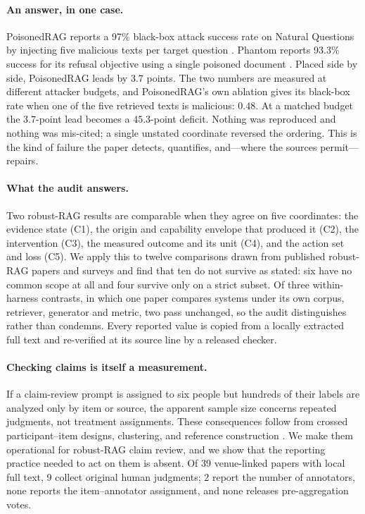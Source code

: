 \documentclass[11pt]{article}
\begin{document}
\paragraph{An answer, in one case.}
PoisonedRAG reports a 97\% black-box attack success rate on Natural Questions
by injecting five malicious texts per target question \citep{poisonedRAG2024}.
Phantom reports 93.3\% success for its refusal objective using a single
poisoned document \citep{phantom2024}. Placed side by side, PoisonedRAG leads
by $3.7$ points. The two numbers are measured at different attacker budgets,
and PoisonedRAG's own ablation gives its black-box rate when one of the five
retrieved texts is malicious: $0.48$. At a matched budget the $3.7$-point lead
becomes a $45.3$-point deficit. Nothing was reproduced and nothing was
mis-cited; a single unstated coordinate reversed the ordering. This is the
kind of failure the paper detects, quantifies, and---where the sources
permit---repairs.



\paragraph{What the audit answers.}
Two robust-RAG results are comparable when they agree on five coordinates:
the evidence state (C1), the origin and capability envelope that produced it
(C2), the intervention (C3), the measured outcome and its unit (C4), and the
action set and loss (C5). We apply this to twelve comparisons drawn from
published robust-RAG papers and surveys and find that ten do not survive as
stated: six have no common scope at all and four survive only on a strict
subset. Of three within-harness contrasts, in which one paper compares systems
under its own corpus, retriever, generator and metric, two pass unchanged, so
the audit distinguishes rather than condemns. Every reported value is copied from
a locally extracted full text and re-verified at its source line by a released
checker.

\paragraph{Checking claims is itself a measurement.}
If a claim-review prompt is assigned to six people but hundreds of their
labels are analyzed only by item or source, the apparent sample size concerns
repeated judgments, not treatment assignments. These consequences follow from
crossed participant--item designs, clustering, and reference construction
\citep{baayen2008crossed,barr2013maximal,abadie2023clustering,card2020power}.
We make them operational for robust-RAG claim review, and we show that the
reporting practice needed to act on them is absent. Of 39 venue-linked papers
with local full text, 9 collect original human judgments; 2 report the number
of annotators, none reports the item--annotator assignment, and none releases
pre-aggregation votes.
\end{document}
